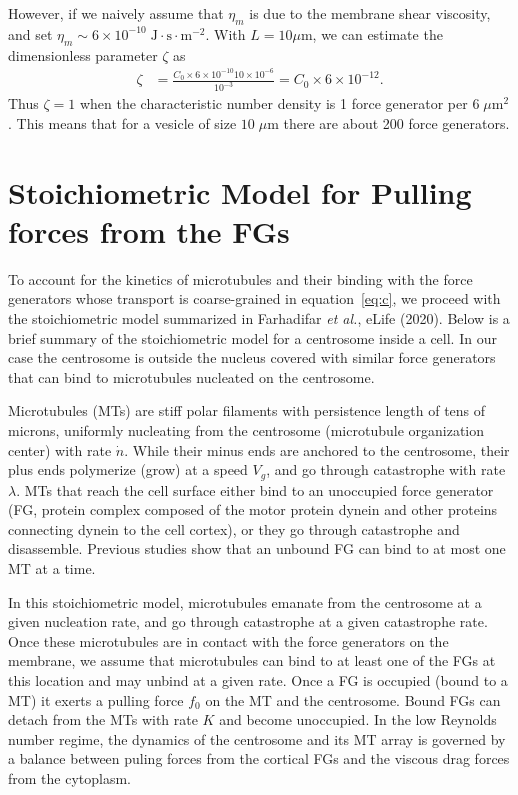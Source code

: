 \documentclass[11pt]{article}
\begin{document}
However, if we naively assume that $\eta_m$ is due to the membrane shear viscosity, and set $\eta_m \sim  6\times 10^{-10}\;\mbox{J}\cdot\mbox{s}\cdot\mbox{m}^{-2}$. With $L = 10 \mu\mbox{m}$, we can estimate the dimensionless parameter $\zeta$ as
\begin{align*}
\zeta &= \frac{C_0 \times 6\times 10^{-10} 10\times 10^{-6}}{10^{-3}}=C_0 \times 6\times 10^{-12}.
\end{align*}
Thus $\zeta=1$ when the characteristic number density is 1 force generator per $6 \; \mu\mbox{m}^2$. This means that for a vesicle of size $10 \; \mu\mbox{m}$ there are about 200 force generators.


\section{Stoichiometric Model for Pulling forces from the FGs \label{sec:stoichiometry}}
To account for the kinetics of microtubules and their binding with the force generators whose transport is coarse-grained in equation~\ref{eq:c}, we proceed with the stoichiometric model summarized in  Farhadifar {\it et al.}, eLife (2020). Below is a brief summary of the stoichiometric model for a centrosome inside a cell. In our case the centrosome is outside the nucleus covered with similar force generators that can bind to microtubules nucleated on the centrosome.

Microtubules (MTs) are stiff polar filaments with persistence length of  tens of microns, uniformly nucleating from the centrosome (microtubule organization center) with rate $\dot n$. While their minus ends are anchored to the centrosome, their plus ends polymerize (grow) at a speed $V_g$, and go through catastrophe with rate $\lambda$. MTs that reach the cell surface either bind to an unoccupied force generator (FG, protein complex composed of the motor protein dynein and other proteins connecting dynein to the cell cortex), or they go through catastrophe and disassemble. Previous studies show that an unbound FG can bind to at most one MT at a time.

In this stoichiometric model, microtubules emanate from the centrosome at a given nucleation rate, and go through catastrophe at a given catastrophe rate. Once these microtubules are in contact with the force generators on the membrane, we assume that  microtubules can bind to at least one of the FGs at this location and may unbind at a given rate. Once a FG is occupied (bound to a MT) it exerts a pulling force $f_0$ on the MT and the centrosome. Bound FGs can detach from the MTs with rate $K$ and become unoccupied. In the low Reynolds number regime, the dynamics of the centrosome and its MT array is governed by a balance between puling forces from the cortical FGs and the viscous drag forces from the cytoplasm. %
\end{document}
